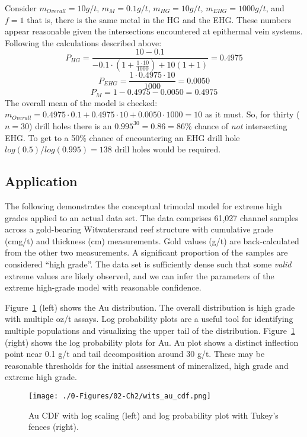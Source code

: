 Consider $m_{Overall} = 10 g/t$, $m_{M} = 0.1 g/t$, $m_{HG} = 10 g/t$, $m_{EHG} = 1000 g/t$, and $f=1$ that is, there is the same metal in the HG and the \gls{EHG}. These numbers appear reasonable given the intersections encountered at epithermal vein systems. Following the calculations described above:
\[
    P_{HG} =
    \frac{10 - 0.1}
    {
        -0.1 \cdot \left( 1+\frac{1 \cdot 10}{1000}\right) + 10(1+1)
    }
    = 0.4975
\]
\[
    P_{EHG} = \frac{1 \cdot 0.4975 \cdot 10}{1000} = 0.0050
\]
\[
    P_{M} = 1 - 0.4975 - 0.0050 = 0.4975
\]
The overall mean of the model is checked: $m_{Overall} = 0.4975 \cdot 0.1 + 0.4975 \cdot 10 + 0.0050 \cdot 1000 = 10$ as it must. So, for thirty ($n=30$) drill holes there is an $0.995^{30}=0.86=86\%$ chance of {\em not} intersecting \gls{EHG}. To get to a 50\% chance of encountering an \gls{EHG} drill hole $log(0.5)/log(0.995)=138$ drill holes would be required.


\FloatBarrier
\subsection{Application}
\label{subsec:02applicationehg}

The following demonstrates the conceptual trimodal model for extreme high grades applied to an actual data set. The data comprises 61,027 channel samples across a gold-bearing Witwatersrand reef structure with cumulative grade (cmg/t) and thickness (cm) measurements. Gold values (g/t) are back-calculated from the other two measurements. A significant proportion of the samples are considered ``high grade''. The data set is sufficiently dense such that some \emph{valid} extreme values are likely observed, and we can infer the parameters of the extreme high-grade model with reasonable confidence.

Figure~\ref{fig:wits_au_cdf} (left) shows the Au distribution. The overall distribution is high grade with multiple oz/t assays. Log probability plots are a useful tool for identifying multiple populations and visualizing the upper tail of the distribution. Figure~\ref{fig:wits_au_cdf} (right) shows the log probability plots for Au. Au plot shows a distinct inflection point near 0.1 g/t and tail decomposition around 30 g/t. These may be reasonable thresholds for the initial assessment of mineralized, high grade and extreme high grade.

\begin{figure}[htb!]
    \centering
    \texttt{[image: ./0-Figures/02-Ch2/wits\_au\_cdf.png]}
    \caption{Au \gls{CDF} with log scaling (left) and log probability plot with Tukey's fences \citep{tukey1977exploratory} (right).}
    \label{fig:wits_au_cdf}
\end{figure}


